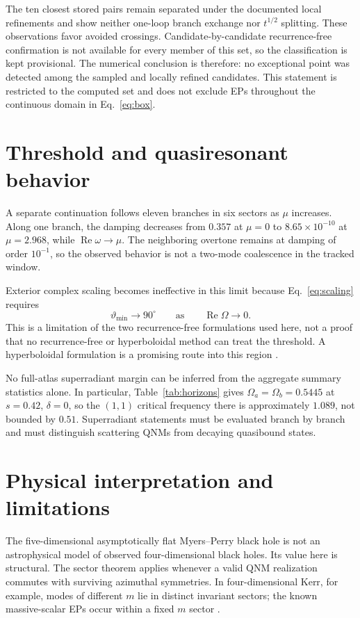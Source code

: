 \documentclass[10pt]{article}
\theoremstyle{plain}
\newcommand{\Rey}{\operatorname{Re}}
\begin{document}
The ten closest stored pairs remain separated under the documented local
refinements and show neither one-loop branch exchange nor $t^{1/2}$ splitting.
These observations favor avoided crossings. Candidate-by-candidate
recurrence-free confirmation is not available for every member of this set, so
the classification is kept provisional. The numerical conclusion is therefore:
no exceptional point was detected among the sampled and locally refined
candidates. This statement is restricted to the computed set and does not
exclude EPs throughout the continuous domain in Eq.~\eqref{eq:box}.

\section{Threshold and quasiresonant behavior}

A separate continuation follows eleven branches in six sectors as $\mu$
increases. Along one branch, the damping decreases from $0.357$ at $\mu=0$ to
$8.65\times10^{-10}$ at $\mu=2.968$, while $\Rey\omega\to\mu$. The neighboring
overtone remains at damping of order $10^{-1}$, so the observed behavior is not
a two-mode coalescence in the tracked window.

Exterior complex scaling becomes ineffective in this limit because
Eq.~\eqref{eq:scaling} requires
\begin{equation}
\vartheta_{\min}\to90^\circ \qquad\text{as}\qquad \Rey\Omega\to0 .
\end{equation}
This is a limitation of the two recurrence-free formulations used here, not a
proof that no recurrence-free or hyperboloidal method can treat the threshold.
A hyperboloidal formulation is a promising route into this region
\citep{jaramillo2021,macedo2026}.

No full-atlas superradiant margin can be inferred from the aggregate summary
statistics alone. In particular, Table~\ref{tab:horizons} gives
$\Omega_a=\Omega_b=0.5445$ at $s=0.42$, $\delta=0$, so the $(1,1)$ critical
frequency there is approximately $1.089$, not bounded by $0.51$. Superradiant
statements must be evaluated branch by branch and must distinguish scattering
QNMs from decaying quasibound states.

\section{Physical interpretation and limitations}

The five-dimensional asymptotically flat Myers--Perry black hole is not an
astrophysical model of observed four-dimensional black holes. Its value here is
structural. The sector theorem applies whenever a valid QNM realization
commutes with surviving azimuthal symmetries. In four-dimensional Kerr, for
example, modes of different $m$ lie in distinct invariant sectors; the known
massive-scalar EPs occur within a fixed $m$ sector
\citep{cavalcante2024,cavalcante2026}.
\end{document}
